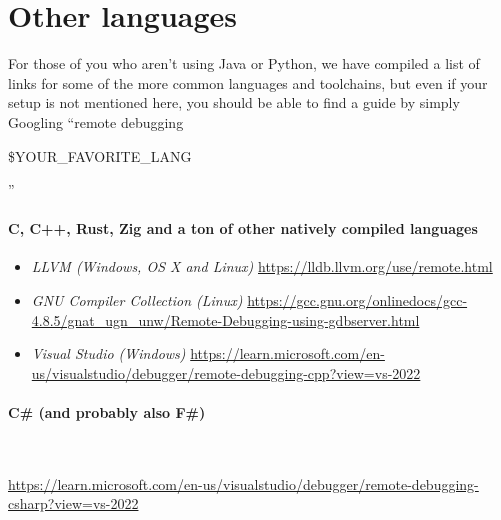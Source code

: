 \documentclass[10pt,a4paper]{article}
\begin{document}
\section{Other languages}
For those of you who aren't using Java or Python, we have compiled a list of links for some of the more common languages and toolchains, but even if your setup is not mentioned here, you should be able to find a guide by simply Googling ``remote debugging \begin{texttt}\$YOUR\_FAVORITE\_LANG\end{texttt}''

\paragraph{C, C++, Rust, Zig and a ton of other natively compiled languages}
    \begin{itemize}
        \item \textit{LLVM (Windows, OS X and Linux)} \newline \url{https://lldb.llvm.org/use/remote.html}
        \item \textit{GNU Compiler Collection (Linux)} \newline \url{https://gcc.gnu.org/onlinedocs/gcc-4.8.5/gnat_ugn_unw/Remote-Debugging-using-gdbserver.html}
        \item \textit{Visual Studio (Windows)} \newline \url{https://learn.microsoft.com/en-us/visualstudio/debugger/remote-debugging-cpp?view=vs-2022}
    \end{itemize}
\paragraph{C\# (and probably also F\#)} {\ }

\noindent \newline \url{https://learn.microsoft.com/en-us/visualstudio/debugger/remote-debugging-csharp?view=vs-2022}
\end{document}
